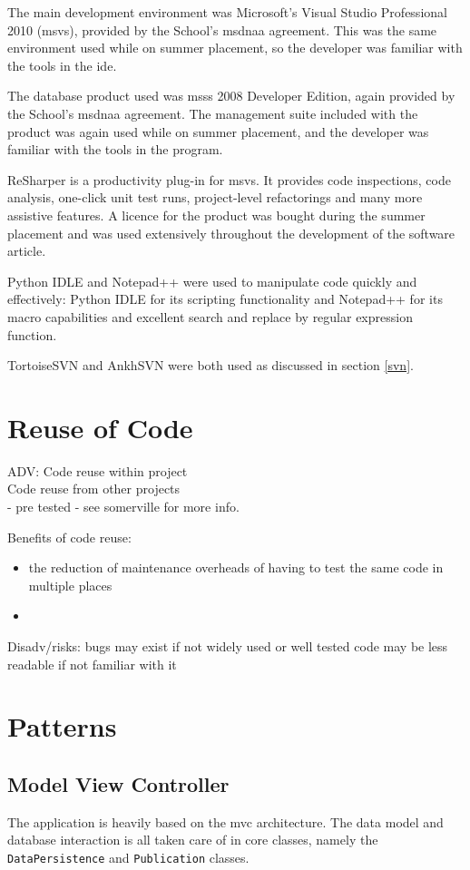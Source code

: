 \documentclass{l4proj}
\begin{document}
The main development environment was Microsoft's Visual Studio Professional 2010 (\gls{msvs}), provided by the School's \gls{msdnaa} agreement.  This was the same environment used while on summer placement, so the developer was familiar with the tools in the \gls{ide}.

The database product used was \gls{msss} 2008 Developer Edition, again provided by the School's \gls{msdnaa} agreement. The management suite included with the product was again used while on summer placement, and the developer was familiar with the tools in the program.

ReSharper is a productivity plug-in for \gls{msvs}.  It provides code inspections, code analysis, one-click unit test runs, project-level refactorings and many more assistive features. A licence for the product was bought during the summer placement and was used extensively throughout the development of the software article.

Python IDLE and Notepad++ were used to manipulate code quickly and effectively: Python IDLE for its scripting functionality and Notepad++ for its macro capabilities and excellent search and replace by regular expression function.

TortoiseSVN and AnkhSVN were both used as discussed in section \ref{svn}.

\section{Reuse of Code}
\label{codeReuse}
ADV:
Code reuse within project \\
Code reuse from other projects \\
 - pre tested
 - see somerville for more info.

Benefits of code reuse:
\begin{itemize}
	\item the reduction of maintenance overheads of having to test the same code in multiple places
	\item 
\end{itemize} 

Disadv/risks:
	bugs may exist if not widely used or well tested
	code may be less readable if not familiar with it
	

\section{Patterns}

\subsection{Model View Controller}
The application is heavily based on the \gls{mvc} architecture.  The data model and database interaction is all taken care of in core classes, namely the \texttt{DataPersistence} and \texttt{Publication} classes.
\end{document}
